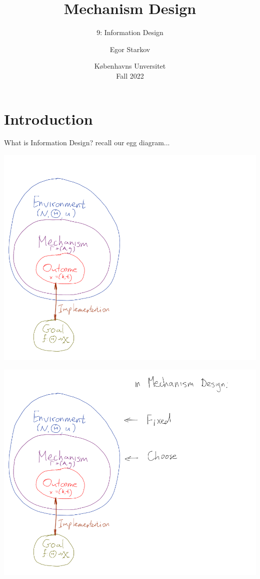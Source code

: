 \documentclass[english,10pt
,aspectratio=169
]{beamer}
\title{Mechanism Design}
\subtitle{9: Information Design}
\author{Egor Starkov}
\date{K{\o}benhavns Unversitet \\
	Fall 2022}
\begin{document}
	\frame[plain]{\titlepage}


\section{Introduction}


\begin{frame}{What is Information Design?}
	recall our egg diagram...
\end{frame}


\begin{frame}
	\centering
	\includegraphics[scale=0.32]{pics/M7/MD_vs_ID_1}
\end{frame}


\begin{frame}
	\centering
	\includegraphics[scale=0.32]{pics/M7/MD_vs_ID_2}
\end{frame}
\end{document}
